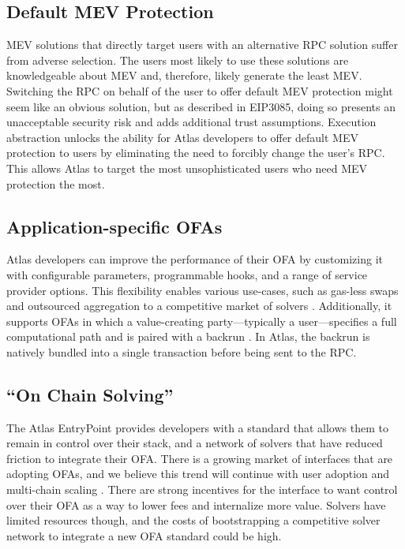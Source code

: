 \documentclass{article}
\begin{document}
\subsection{Default MEV Protection}

MEV solutions that directly target users with an alternative RPC solution suffer from adverse selection. The users most likely to use these solutions are knowledgeable about MEV and, therefore, likely generate the least MEV. Switching the RPC on behalf of the user to offer default MEV protection might seem like an obvious solution, but as described in EIP3085, doing so presents an unacceptable security risk and adds additional trust assumptions. Execution abstraction unlocks the ability for Atlas developers to offer default MEV protection to users by eliminating the need to forcibly change the user’s RPC. This allows Atlas to target the most unsophisticated users who need MEV protection the most. 

\subsection{Application-specific OFAs}

Atlas developers can improve the performance of their OFA by customizing it with configurable parameters, programmable hooks, and a range of service provider options. This flexibility enables various use-cases, such as gas-less swaps and outsourced aggregation to a competitive market of solvers \cite{uni}. Additionally, it supports OFAs in which a value-creating party—typically a user—specifies a full computational path and is paired with a backrun \cite{share}. In Atlas, the backrun is natively bundled into a single transaction before being sent to the RPC.

\subsection{“On Chain Solving”}

The Atlas EntryPoint provides developers with a standard that allows them to remain in control over their stack, and a network of solvers that have reduced friction to integrate their OFA. There is a growing market of interfaces that are adopting OFAs, and we believe this trend will continue with user adoption and multi-chain scaling \cite{art}. There are strong incentives for the interface to want control over their OFA as a way to lower fees and internalize more value. Solvers have limited resources though, and the costs of bootstrapping a competitive solver network to integrate a new OFA standard could be high.
\end{document}
